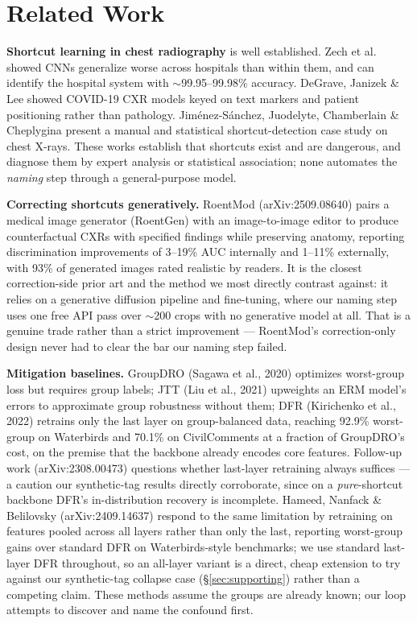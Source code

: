 \documentclass{ieeeaccess}
\begin{document}
\section{Related Work}
\textbf{Shortcut learning in chest radiography} is well established. Zech et al.\ \cite{zech2018} showed CNNs generalize worse across hospitals than within them, and can identify the hospital system with $\sim$99.95--99.98\% accuracy. DeGrave, Janizek \& Lee \cite{degrave2021} showed COVID-19 CXR models keyed on text markers and patient positioning rather than pathology. Jim\'enez-S\'anchez, Juodelyte, Chamberlain \& Cheplygina \cite{jimenez2023} present a manual and statistical shortcut-detection case study on chest X-rays. These works establish that shortcuts exist and are dangerous, and diagnose them by expert analysis or statistical association; none automates the \emph{naming} step through a general-purpose model.

\textbf{Correcting shortcuts generatively.} RoentMod (arXiv:2509.08640) \cite{roentmod} pairs a medical image generator (RoentGen) with an image-to-image editor to produce counterfactual CXRs with specified findings while preserving anatomy, reporting discrimination improvements of 3--19\% AUC internally and 1--11\% externally, with 93\% of generated images rated realistic by readers. It is the closest correction-side prior art and the method we most directly contrast against: it relies on a generative diffusion pipeline and fine-tuning, where our naming step uses one free API pass over $\sim$200 crops with no generative model at all. That is a genuine trade rather than a strict improvement --- RoentMod's correction-only design never had to clear the bar our naming step failed.

\textbf{Mitigation baselines.} GroupDRO (Sagawa et al., 2020) \cite{sagawa2020groupdro} optimizes worst-group loss but requires group labels; JTT (Liu et al., 2021) \cite{liu2021jtt} upweights an ERM model's errors to approximate group robustness without them; DFR (Kirichenko et al., 2022) \cite{kirichenko2022dfr} retrains only the last layer on group-balanced data, reaching 92.9\% worst-group on Waterbirds and 70.1\% on CivilComments at a fraction of GroupDRO's cost, on the premise that the backbone already encodes core features. Follow-up work (arXiv:2308.00473) \cite{dfr_followup} questions whether last-layer retraining always suffices --- a caution our synthetic-tag results directly corroborate, since on a \emph{pure}-shortcut backbone DFR's in-distribution recovery is incomplete. Hameed, Nanfack \& Belilovsky (arXiv:2409.14637) \cite{dfr_multilayer} respond to the same limitation by retraining on features pooled across all layers rather than only the last, reporting worst-group gains over standard DFR on Waterbirds-style benchmarks; we use standard last-layer DFR throughout, so an all-layer variant is a direct, cheap extension to try against our synthetic-tag collapse case (\S\ref{sec:supporting}) rather than a competing claim. These methods assume the groups are already known; our loop attempts to discover and name the confound first.
\end{document}
